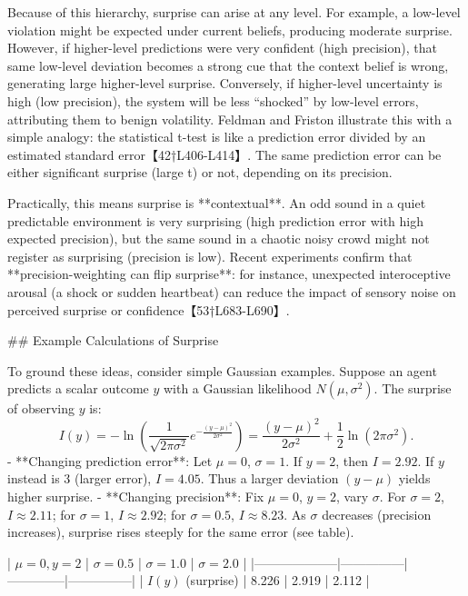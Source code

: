 \documentclass[a4paper]{article}
\begin{document}
    Because of this hierarchy, surprise can arise at any level.  For example, a low-level violation might be expected under current beliefs, producing moderate surprise.  However, if higher-level predictions were very confident (high precision), that same low-level deviation becomes a strong cue that the context belief is wrong, generating large higher-level surprise.  Conversely, if higher-level uncertainty is high (low precision), the system will be less “shocked” by low-level errors, attributing them to benign volatility.  Feldman and Friston illustrate this with a simple analogy: the statistical t-test is like a prediction error divided by an estimated standard error【42†L406-L414】.  The same prediction error can be either significant surprise (large t) or not, depending on its precision.
    
    Practically, this means surprise is **contextual**.  An odd sound in a quiet predictable environment is very surprising (high prediction error with high expected precision), but the same sound in a chaotic noisy crowd might not register as surprising (precision is low).  Recent experiments confirm that **precision-weighting can flip surprise**: for instance, unexpected interoceptive arousal (a shock or sudden heartbeat) can reduce the impact of sensory noise on perceived surprise or confidence【53†L683-L690】.
    
    ## Example Calculations of Surprise
    
    To ground these ideas, consider simple Gaussian examples.  Suppose an agent predicts a scalar outcome \(y\) with a Gaussian likelihood \(N(\mu,\sigma^2)\).  The surprise of observing \(y\) is:
    \[
    I(y) = -\ln\left(\frac{1}{\sqrt{2\pi\sigma^2}} e^{-\frac{(y-\mu)^2}{2\sigma^2}}\right)
    = \frac{(y-\mu)^2}{2\sigma^2} + \frac12\ln(2\pi\sigma^2).
    \]
    - **Changing prediction error**: Let \(\mu=0\), \(\sigma=1\).  If \(y=2\), then \(I=2.92\).  If \(y\) instead is 3 (larger error), \(I=4.05\).  Thus a larger deviation \((y-\mu)\) yields higher surprise.
    - **Changing precision**: Fix \(\mu=0\), \(y=2\), vary \(\sigma\).  For \(\sigma=2\), \(I\approx2.11\); for \(\sigma=1\), \(I\approx2.92\); for \(\sigma=0.5\), \(I\approx8.23\).  As \(\sigma\) decreases (precision increases), surprise rises steeply for the same error (see table).
    
    |  \( \mu=0, y=2\)   | \(\sigma=0.5\) | \(\sigma=1.0\) | \(\sigma=2.0\) |
    |--------------------|---------------|--------------|---------------|
    | \(I(y)\) (surprise) | 8.226         | 2.919        | 2.112         |
    
\end{document}
